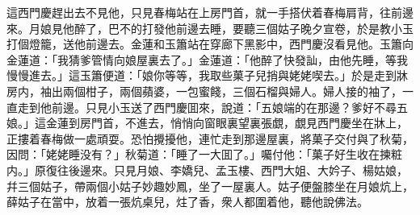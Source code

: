 這西門慶趕出去不見他，只見春梅站在上房門首，就一手搭伏着春梅肩背，往前邊來。月娘見他醉了，巴不的打發他前邊去睡，要聽三個姑子晚夕宣卷，於是教小玉打個燈籠，送他前邊去。金蓮和玉簫站在穿廊下黑影中，西門慶沒看見他。玉簫向金蓮道：「我猜爹管情向娘屋裏去了。」金蓮道：「他醉了快發訕，由他先睡，等我慢慢進去。」這玉簫便道：「娘你等等，我取些菓子兒捎與姥姥喫去。」於是走到牀房内，袖出兩個柑子，兩個蘋婆，一包蜜餞，三個石榴與婦人。婦人接的袖了，一直走到他前邊。只見小玉送了西門慶囬來，說道：「五娘端的在那邊？爹好不尋五娘。」這金蓮到房門首，不進去，悄悄向窗眼裏望裏張覷，覷見西門慶坐在牀上，正摟着春梅做一處頑耍。恐怕攪擾他，連忙走到那邊屋裏，將菓子交付與了秋菊，因問：「姥姥睡没有？」秋菊道：「睡了一大囬了。」囑付他：「菓子好生收在揀粧内。」原復往後邊來。只見月娘、李嬌兒、孟玉樓、西門大姐、大妗子、楊姑娘，幷三個姑子，帶兩個小姑子妙趣妙鳳，坐了一屋裏人。姑子便盤膝坐在月娘炕上，薛姑子在當中，放着一張炕桌兒，炷了香，衆人都圍着他，聽他說佛法。

